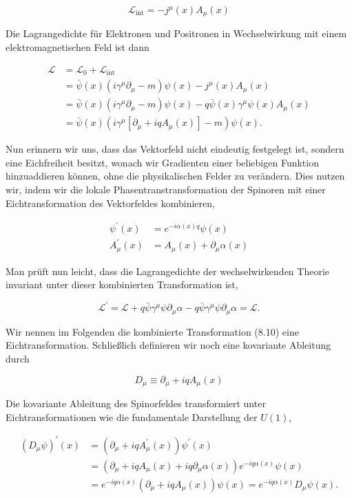 \documentclass[10pt, letterpaper]{article}
\begin{document}
$$
\mathscr{L}_{\mathrm{int}}=-j^{\mu}(x) A_{\mu}(x)
$$

Die Lagrangedichte für Elektronen und Positronen in Wechselwirkung mit einem elektromagnetischen Feld ist dann

$$
\begin{aligned}
\mathscr{L} & =\mathscr{L}_{0}+\mathscr{L}_{\text {int }} \\
& =\bar{\psi}(x)\left(i \gamma^{\mu} \partial_{\mu}-m\right) \psi(x)-j^{\mu}(x) A_{\mu}(x) \\
& =\bar{\psi}(x)\left(i \gamma^{\mu} \partial_{\mu}-m\right) \psi(x)-q \bar{\psi}(x) \gamma^{\mu} \psi(x) A_{\mu}(x) \\
& =\bar{\psi}(x)\left(i \gamma^{\mu}\left[\partial_{\mu}+i q A_{\mu}(x)\right]-m\right) \psi(x) .
\end{aligned}
$$

Nun erinnern wir uns, dass das Vektorfeld nicht eindeutig festgelegt ist, sondern eine Eichfreiheit besitzt, wonach wir Gradienten einer beliebigen Funktion hinzuaddieren können, ohne die physikalischen Felder zu verändern. Dies nutzen wir, indem wir die lokale Phasentranstransformation der Spinoren mit einer Eichtransformation des Vektorfeldes kombinieren,

$$
\begin{aligned}
\psi^{\prime}(x) & =e^{-i \alpha(x) q} \psi(x) \\
A_{\mu}^{\prime}(x) & =A_{\mu}(x)+\partial_{\mu} \alpha(x)
\end{aligned}
$$

Man prüft nun leicht, dass die Lagrangedichte der wechselwirkenden Theorie invariant unter dieser kombinierten Transformation ist,

$$
\mathscr{L}^{\prime}=\mathscr{L}+q \bar{\psi} \gamma^{\mu} \psi \partial_{\mu} \alpha-q \bar{\psi} \gamma^{\mu} \psi \partial_{\mu} \alpha=\mathscr{L} .
$$

Wir nennen im Folgenden die kombinierte Transformation (8.10) eine Eichtransformation. Schließlich definieren wir noch eine kovariante Ableitung durch

$$
D_{\mu} \equiv \partial_{\mu}+i q A_{\mu}(x)
$$

Die kovariante Ableitung des Spinorfeldes transformiert unter Eichtransformationen wie die fundamentale Darstellung der $U(1)$,

$$
\begin{aligned}
\left(D_{\mu} \psi\right)^{\prime}(x) & =\left(\partial_{\mu}+i q A_{\mu}^{\prime}(x)\right) \psi^{\prime}(x) \\
& =\left(\partial_{\mu}+i q A_{\mu}(x)+i q \partial_{\mu} \alpha(x)\right) e^{-i q \alpha(x)} \psi(x) \\
& =e^{-i q \alpha(x)}\left(\partial_{\mu}+i q A_{\mu}(x)\right) \psi(x)=e^{-i q \alpha(x)} D_{\mu} \psi(x) .
\end{aligned}
$$
\end{document}
